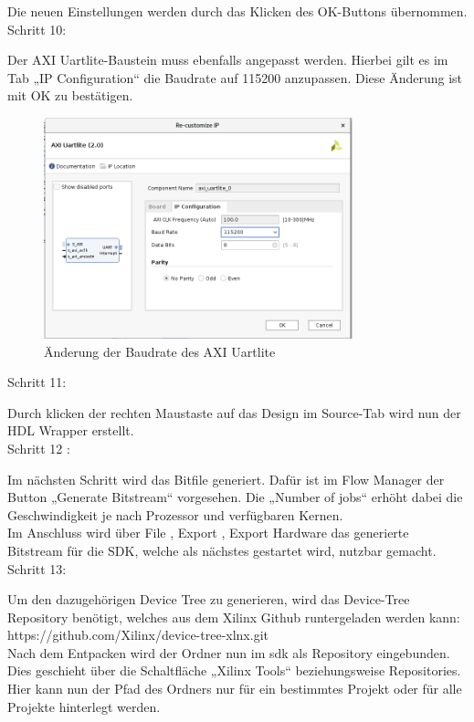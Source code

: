 Die neuen Einstellungen werden durch das Klicken des OK-Buttons übernommen.\\

Schritt 10:

Der AXI Uartlite-Baustein muss ebenfalls angepasst werden. Hierbei gilt es im Tab „IP Configuration“ die Baudrate auf 115200 anzupassen.
Diese Änderung ist mit OK zu bestätigen.

\begin{figure}[H]
\centering
\includegraphics[width=0.8\textwidth]{Hauptteil/Schritt10.png}
\caption{Änderung der Baudrate des AXI Uartlite}
\label{fig:mbschritt10}
\end{figure}

Schritt 11:

Durch klicken der rechten Maustaste auf das Design im Source-Tab wird nun der HDL Wrapper erstellt.\\

Schritt 12 :

Im nächsten Schritt wird das Bitfile generiert. Dafür ist im Flow Manager der Button „Generate Bitstream“ vorgesehen.
 Die „Number of jobs“ erhöht dabei die Geschwindigkeit je nach Prozessor und verfügbaren Kernen.\\
 Im Anschluss wird über File , Export , Export Hardware das generierte Bitstream für die SDK, welche als nächstes gestartet wird, nutzbar gemacht.\\


Schritt 13:

Um den dazugehörigen Device Tree zu generieren, wird das Device-Tree
 Repository benötigt, welches aus dem Xilinx Github runtergeladen werden kann: https://github.com/Xilinx/device-tree-xlnx.git\\
Nach dem Entpacken wird der Ordner nun im \ac{sdk} als Repository eingebunden.
 Dies geschieht über die Schaltfläche „Xilinx Tools“ beziehungsweise Repositories.
  Hier kann nun der Pfad des Ordners nur für ein bestimmtes Projekt oder für alle Projekte hinterlegt werden.

